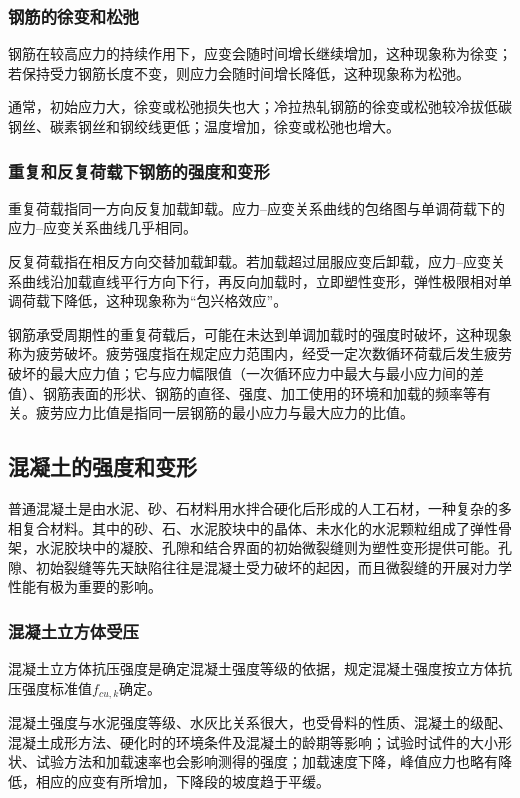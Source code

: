 \documentclass{article}
\begin{document}
\subsubsection{钢筋的徐变和松弛}
\par 钢筋在较高应力的持续作用下，应变会随时间增长继续增加，这种现象称为徐变；若保持受力钢筋长度不变，则应力会随时间增长降低，这种现象称为松弛。
\par 通常，初始应力大，徐变或松弛损失也大；冷拉热轧钢筋的徐变或松弛较冷拔低碳钢丝、碳素钢丝和钢绞线更低；温度增加，徐变或松弛也增大。
\subsubsection{重复和反复荷载下钢筋的强度和变形}
\par 重复荷载指同一方向反复加载卸载。应力--应变关系曲线的包络图与单调荷载下的应力--应变关系曲线几乎相同。
\par 反复荷载指在相反方向交替加载卸载。若加载超过屈服应变后卸载，应力--应变关系曲线沿加载直线平行方向下行，再反向加载时，立即塑性变形，弹性极限相对单调荷载下降低，这种现象称为“包兴格效应”。
\par 钢筋承受周期性的重复荷载后，可能在未达到单调加载时的强度时破坏，这种现象称为疲劳破坏。疲劳强度指在规定应力范围内，经受一定次数循环荷载后发生疲劳破坏的最大应力值；它与应力幅限值（一次循环应力中最大与最小应力间的差值）、钢筋表面的形状、钢筋的直径、强度、加工使用的环境和加载的频率等有关。疲劳应力比值是指同一层钢筋的最小应力与最大应力的比值。
\subsection{混凝土的强度和变形}
\par 普通混凝土是由水泥、砂、石材料用水拌合硬化后形成的人工石材，一种复杂的多相复合材料。其中的砂、石、水泥胶块中的晶体、未水化的水泥颗粒组成了弹性骨架，水泥胶块中的凝胶、孔隙和结合界面的初始微裂缝则为塑性变形提供可能。孔隙、初始裂缝等先天缺陷往往是混凝土受力破坏的起因，而且微裂缝的开展对力学性能有极为重要的影响。
\subsubsection{混凝土立方体受压}
\par 混凝土立方体抗压强度是确定混凝土强度等级的依据，\gb{}规定混凝土强度按立方体抗压强度标准值$f_{cu,k}$确定。
\par 混凝土强度与水泥强度等级、水灰比关系很大，也受骨料的性质、混凝土的级配、混凝土成形方法、硬化时的环境条件及混凝土的龄期等影响；试验时试件的大小形状、试验方法和加载速率也会影响测得的强度；加载速度下降，峰值应力也略有降低，相应的应变有所增加，下降段的坡度趋于平缓。
\end{document}

